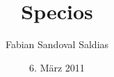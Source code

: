 \subject{Manifest}
\title{Specios}
\author{Fabian Sandoval Saldias}
\date{6. März 2011}
\publishers{\textrm{}\textrm{}}

